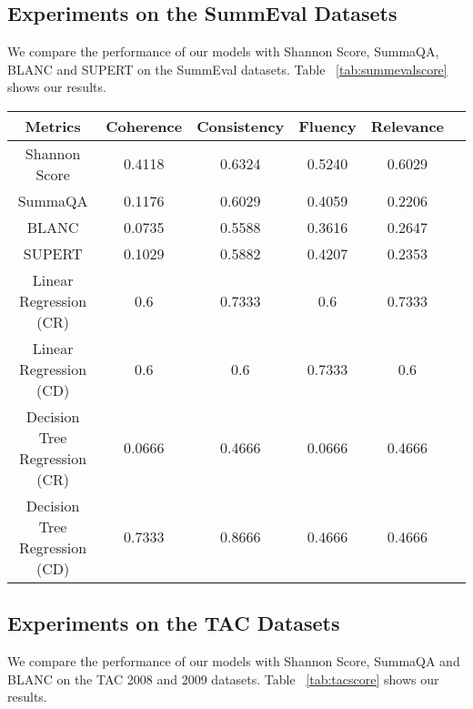 \subsection{Experiments on the SummEval Datasets}
We compare the performance of our models with Shannon Score, SummaQA, BLANC and SUPERT on the SummEval datasets. Table ~\ref{tab:summevalscore} shows our results.
\begin{table*}[th]
	\scriptsize
	\centering
\begin{tabular*}{\textwidth}{c @{\extracolsep{\fill}} ccccc}
		\hline
		Metrics & Coherence & Consistency & Fluency & Relevance\\
		\hline
		Shannon Score & 0.4118 & 0.6324 & 0.5240 & 0.6029\\
		SummaQA & 0.1176 & 0.6029 & 0.4059 & 0.2206\\
		BLANC &  0.0735 & 0.5588 & 0.3616 & 0.2647\\
		SUPERT & 0.1029 & 0.5882 & 0.4207 & 0.2353\\
		Linear Regression (CR) & 0.6 & 0.7333 & 0.6 & 0.7333\\
		Linear Regression (CD) &  0.6 & 0.6 & 0.7333 & 0.6\\
		Decision Tree Regression (CR) & 0.0666 & 0.4666 & 0.0666 & 0.4666\\
		Decision Tree Regression (CD) &  0.7333 & 0.8666 & 0.4666 & 0.4666\\
		\hline
\end{tabular*}
	\caption{Correlations with human annotations score in terms of coherence, consistency, fluency, and relevance respectively for Shannon Score, SummaQA, BLANC, SUPERT, output from linear regression and decision tree regression model with CR and CD as training feature on the SummEval dataset.}
	\label{tab:summevalscore}
\end{table*}

\subsection{Experiments on the TAC Datasets}
We compare the performance of our models with Shannon Score, SummaQA and BLANC on the TAC 2008 and 2009 datasets. Table ~\ref{tab:tacscore} shows our results.

